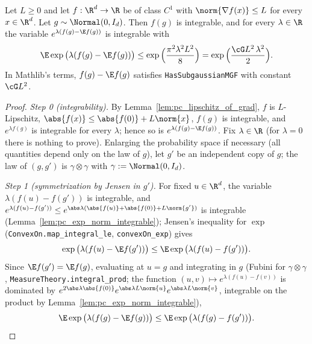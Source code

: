 \begin{lemma}\label{lem:maurey_pisier}
\leanok
{}
Let $L \ge 0$ and let $f : \R^d \to \R$ be of class $C^1$ with $\norm{\nabla f(x)} \le L$ for
every $x \in \R^d$. Let $g \sim \Normal(0, I_d)$. Then $f(g)$ is integrable, and for every
$\lambda \in \R$ the variable $e^{\lambda(f(g) - \E f(g))}$ is integrable with
\[
  \E\exp\big(\lambda(f(g) - \E f(g))\big) \le \exp\Big(\frac{\pi^2\lambda^2L^2}{8}\Big)
  = \exp\Big(\frac{\cG L^2\,\lambda^2}{2}\Big).
\]
In Mathlib's terms, $f(g) - \E f(g)$ satisfies \texttt{HasSubgaussianMGF} with constant
$\cG L^2$.
\end{lemma}

\begin{proof}
\leanok
{}
\emph{Step 0 (integrability).} By Lemma~\ref{lem:pc_lipschitz_of_grad}, $f$ is $L$-Lipschitz,
$\abs{f(x)} \le \abs{f(0)} + L\norm{x}$, $f(g)$ is integrable, and $e^{\lambda f(g)}$ is
integrable for every $\lambda$; hence so is $e^{\lambda(f(g)-\E f(g))}$. Fix $\lambda \in \R$
(for $\lambda = 0$ there is nothing to prove). Enlarging the probability space if necessary
(all quantities depend only on the law of $g$), let $g'$ be an independent copy of $g$; the
law of $(g,g')$ is $\gamma\otimes\gamma$ with $\gamma := \Normal(0,I_d)$.

\emph{Step 1 (symmetrization by Jensen in $g'$).} For fixed $u \in \R^d$, the variable
$\lambda(f(u) - f(g'))$ is integrable, and $e^{\lambda(f(u)-f(g'))} \le
e^{\abs\lambda(\abs{f(u)} + \abs{f(0)} + L\norm{g'})}$ is integrable
(Lemma~\ref{lem:pc_exp_norm_integrable}); Jensen's inequality for $\exp$
(\texttt{ConvexOn.map\_integral\_le}, \texttt{convexOn\_exp}) gives
\[
  \exp\big(\lambda(f(u) - \E f(g'))\big) \le \E\exp\big(\lambda(f(u) - f(g'))\big).
\]
Since $\E f(g') = \E f(g)$, evaluating at $u = g$ and integrating in $g$ (Fubini for
$\gamma\otimes\gamma$, \texttt{MeasureTheory.integral\_prod}; the function
$(u,v) \mapsto e^{\lambda(f(u)-f(v))}$ is dominated by
$e^{2\abs\lambda\abs{f(0)}}e^{\abs\lambda L\norm{u}}e^{\abs\lambda L\norm{v}}$, integrable on the
product by Lemma~\ref{lem:pc_exp_norm_integrable}),
\[
  \E\exp\big(\lambda(f(g) - \E f(g))\big) \le \E\exp\big(\lambda(f(g) - f(g'))\big).
\]


\end{proof}
